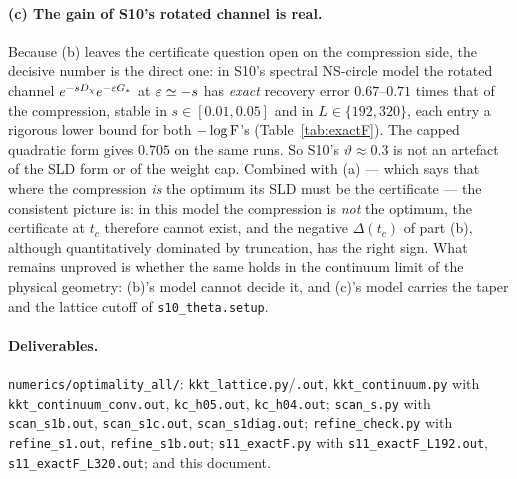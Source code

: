\documentclass[11pt]{article}
\begin{document}
\paragraph{(c) The gain of S10's rotated channel is real.}
Because (b) leaves the certificate question open on the compression side, the decisive number is
the direct one: in S10's spectral NS-circle model the rotated channel
$e^{-sD_\chi}e^{-\varepsilon G_*}$ at $\varepsilon\simeq-s$ has \emph{exact} recovery error $0.67$--$0.71$ times
that of the compression, stable in $s\in[0.01,0.05]$ and in $L\in\{192,320\}$, each entry a
rigorous lower bound for both $-\log\operatorname{F}$'s (Table~\ref{tab:exactF}).  The capped quadratic form
gives $0.705$ on the same runs.  So S10's $\vartheta\approx0.3$ is not an artefact of the SLD
form or of the weight cap.  Combined with (a) --- which says that where the compression \emph{is}
the optimum its SLD must be the certificate --- the consistent picture is: in this model the
compression is \emph{not} the optimum, the certificate at $t_c$ therefore cannot exist, and the
negative $\Delta(t_c)$ of part (b), although quantitatively dominated by truncation, has the
right sign.  What remains unproved is whether the same holds in the continuum limit of the
physical geometry: (b)'s model cannot decide it, and (c)'s model carries the taper and the
lattice cutoff of \texttt{s10\_theta.setup}.

\paragraph{Deliverables.}
\texttt{numerics/optimality\_all/}: \texttt{kkt\_lattice.py}/\texttt{.out},
\texttt{kkt\_continuum.py} with \texttt{kkt\_continuum\_conv.out}, \texttt{kc\_h05.out},
\texttt{kc\_h04.out}; \texttt{scan\_s.py} with \texttt{scan\_s1b.out}, \texttt{scan\_s1c.out},
\texttt{scan\_s1diag.out}; \texttt{refine\_check.py} with \texttt{refine\_s1.out},
\texttt{refine\_s1b.out}; \texttt{s11\_exactF.py} with \texttt{s11\_exactF\_L192.out},
\texttt{s11\_exactF\_L320.out}; and this document.
\end{document}
